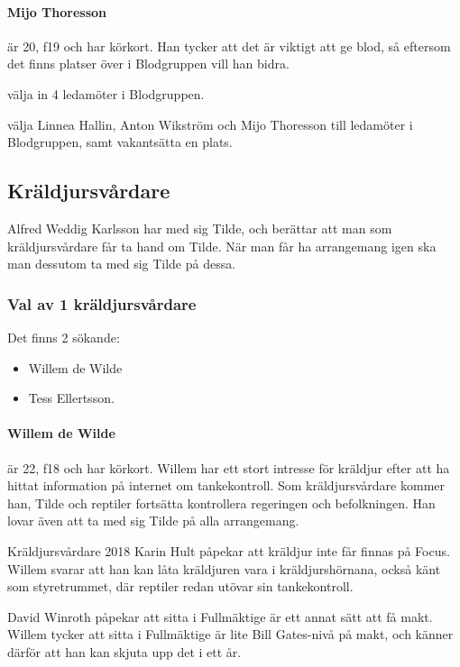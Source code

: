 \documentclass[hidelinks]{sektionsmote}
\begin{document}
\paragraph{Mijo Thoresson} är 20, f19 och har körkort.
Han tycker att det är viktigt att ge blod, så eftersom det finns platser över i Blodgruppen vill han bidra.

\begin{beslut}
  \item välja in 4 ledamöter i Blodgruppen.
  \item välja Linnea Hallin, Anton Wikström och Mijo Thoresson till ledamöter i Blodgruppen, samt vakantsätta en plats.
\end{beslut}


\subsection{Kräldjursvårdare}
Alfred Weddig Karlsson har med sig Tilde, och berättar att man som kräldjursvårdare får ta hand om Tilde.
När man får ha arrangemang igen ska man dessutom ta med sig Tilde på dessa.

\subsubsection{Val av 1 kräldjursvårdare}
Det finns 2 sökande:
\begin{itemize}
    \item Willem de Wilde
    \item Tess Ellertsson.
\end{itemize}

\paragraph{Willem de Wilde} är 22, f18 och har körkort.
Willem har ett stort intresse för kräldjur efter att ha hittat information på internet om tankekontroll.
Som kräldjursvårdare kommer han, Tilde och reptiler fortsätta kontrollera regeringen och befolkningen.
Han lovar även att ta med sig Tilde på alla arrangemang.

Kräldjursvårdare 2018 Karin Hult påpekar att kräldjur inte får finnas på Focus.
Willem svarar att han kan låta kräldjuren vara i kräldjurshörnana, också känt som styretrummet, där reptiler redan utövar sin tankekontroll.

David Winroth påpekar att sitta i Fullmäktige är ett annat sätt att få makt.
Willem tycker att sitta i Fullmäktige är lite Bill Gates-nivå på makt, och känner därför att han kan skjuta upp det i ett år.
\end{document}
